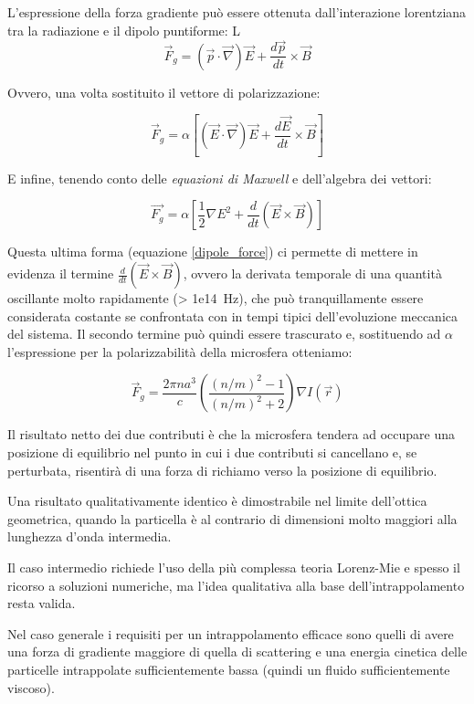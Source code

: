 L'espressione della forza gradiente può essere ottenuta dall'interazione
lorentziana tra la radiazione e il dipolo puntiforme:
L
$$ \vec{F}_g =
  \left( \vec{p} \cdot \vec{\nabla} \right) \vec{E}
  + \frac{d\vec{p}}{dt} \times \vec{B}
$$

Ovvero, una volta sostituito il vettore di polarizzazione:

$$ \vec{F}_g = \alpha
\left[
    \left( \vec{E} \cdot \vec{\nabla} \right) \vec{E}
    + \frac{d\vec{E}}{dt} \times \vec{B}
\right]
$$

E infine, tenendo conto delle \emph{equazioni di Maxwell} e dell'algebra dei vettori:

\begin{equation}
\label{dipole_force}
\vec{F_g}
= \alpha 
\left[
    \frac{1}{2}\nabla E^2
    + \frac{d}{dt}\left(\vec{E} \times \vec{B}\right)
\right]
\end{equation}

Questa ultima forma (equazione \ref{dipole_force}) ci permette di mettere in evidenza il termine $\frac{d}{dt}(\vec{E} \times \vec{B})$, ovvero la derivata temporale di una quantità oscillante molto rapidamente (\SI{> 1e14}{\Hz}), che
può tranquillamente essere considerata costante se confrontata con in tempi
tipici dell'evoluzione meccanica del sistema. Il secondo termine può quindi
essere trascurato e, sostituendo ad $\alpha$ l'espressione per la polarizzabilità
della microsfera otteniamo:

\begin{equation}
    \vec{F}_g = 
    \frac{2\pi n a^3}{c}
    \left(
    \frac{(n/m)^2 - 1}{(n/m)^2 + 2}
    \right)
    \nabla I(\vec{r})
\end{equation}

Il risultato netto dei due contributi è che la microsfera tendera ad occupare una
posizione di equilibrio nel punto in cui i due contributi si cancellano e, se
perturbata, risentirà di una forza di richiamo verso la posizione di equilibrio.

Una risultato qualitativamente identico è dimostrabile nel limite dell'ottica
geometrica, quando la particella è al contrario di dimensioni molto maggiori
alla lunghezza d'onda intermedia.

Il caso intermedio richiede l'uso della più complessa teoria Lorenz-Mie e spesso
il ricorso a soluzioni numeriche, ma l'idea qualitativa alla base
dell'intrappolamento resta valida.

Nel caso generale i requisiti per un intrappolamento efficace sono quelli di avere
una forza di gradiente maggiore di quella di scattering e una energia cinetica
delle particelle intrappolate sufficientemente bassa (quindi un fluido sufficientemente viscoso).

